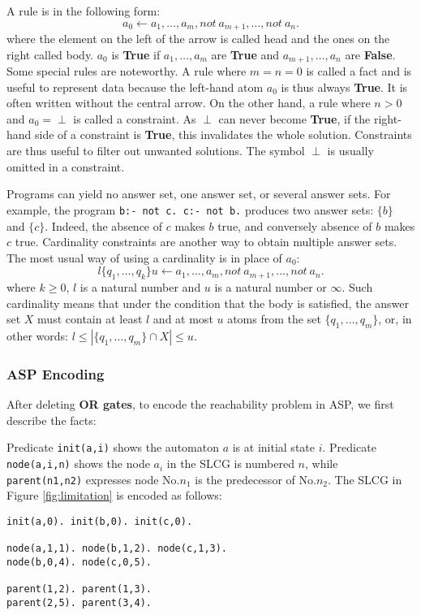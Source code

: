 A rule is in the following form:
$$a_0 \gets a_1 , \ldots , a_m, not\ a_{m+1}, \ldots , not\ a_n.$$
where the element on the left of the arrow is called head and the ones on the right called body.
$a_0$ is \textbf{True} if $a_1 , \ldots , a_m$ are \textbf{True} and $a_{m+1}, \ldots , a_n$ are \textbf{False}.
Some special rules are noteworthy. 
A rule where $m = n = 0$ is called a fact and is useful to represent data because the left-hand atom $a_0$ is thus always \textbf{True}.
It is often written without the central arrow.
On the other hand, a rule where $n > 0$ and $a_0 = \perp$ is called a constraint.
As $\perp$ can never become \textbf{True}, if the right-hand side of a constraint is \textbf{True}, this invalidates the whole solution.
Constraints are thus useful to filter out unwanted solutions.
The symbol $\perp$ is usually omitted in a constraint.

Programs can yield no answer set, one answer set, or several answer sets. 
For example, the program \texttt{b:- not c. c:- not b.}  produces two answer sets: $\{b\}$ and $\{c\}$.
Indeed, the absence of $c$ makes $b$ true, and conversely absence of $b$ makes $c$ true. 
Cardinality constraints are another way to obtain multiple answer sets. 
The most usual way of using a cardinality is in place of $a_0$:
$$l \{q_1, \ldots , q_k \} u \gets a_1, \ldots , a_m, not\ a_{m+1}, \ldots , not\ a_n.$$
where $k \geq 0$, $l$ is a natural number and $u$ is a natural number or $\infty$. 
Such cardinality means that under the condition that the body is satisfied, the answer set $X$ must contain at least $l$ and at most $u$ atoms from the set $\{q_1, \ldots  , q_m\}$, or, in other words: $l \leq |\{q_1, \ldots  , q_m\} \cap X| \leq u$. %

\subsubsection*{ASP Encoding}

After deleting \textbf{OR gates}, to encode the reachability problem in ASP, we first describe the facts:

Predicate \texttt{init(a,i)} shows the automaton $a$ is at initial state $i$. %
Predicate \texttt{node(a,i,n)} shows the node $a_i$ in the SLCG is numbered $n$, while \texttt{parent(n1,n2)} expresses node No.$n_1$ is the predecessor of No.$n_2$.
The SLCG in Figure \ref{fig:limitation} is encoded as follows:
\begin{Verbatim}[commandchars=\\\{\}]
init(a,0). init(b,0). init(c,0).

node(a,1,1). node(b,1,2). node(c,1,3).
node(b,0,4). node(c,0,5).

parent(1,2). parent(1,3).
parent(2,5). parent(3,4).
\end{Verbatim}

